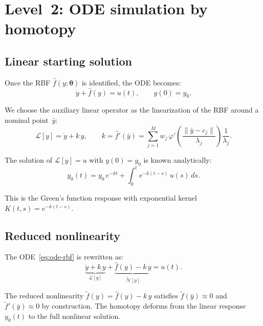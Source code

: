 \documentclass[11pt,a4paper]{article}
\begin{document}
\section{Level~2: ODE simulation by homotopy}
\label{sec:simulation}

\subsection{Linear starting solution}

Once the RBF $\hat{f}(y; \boldsymbol{\theta})$ is identified, the ODE becomes:
\begin{equation}
\dot{y} + \hat{f}(y) = u(t), \qquad y(0) = y_0.
\label{eq:ode-rbf}
\end{equation}

We choose the auxiliary linear operator as the linearization of the RBF around a nominal point~$\bar{y}$:
\begin{equation}
\mathcal{L}[y] = \dot{y} + k\,y, \qquad k = \hat{f}'(\bar{y}) = \sum_{j=1}^{M} w_j\,\varphi'\!\left(\frac{\|\bar{y} - c_j\|}{\lambda_j}\right)\frac{1}{\lambda_j}.
\label{eq:L-linear}
\end{equation}

The solution of $\mathcal{L}[y] = u$ with $y(0) = y_0$ is known analytically:
\begin{equation}
y_0(t) = y_0\,e^{-kt} + \int_0^t e^{-k(t-s)}\,u(s)\,ds.
\label{eq:y0-linear}
\end{equation}

This is the Green's function response with exponential kernel $K(t,s) = e^{-k(t-s)}$.

\subsection{Reduced nonlinearity}

The ODE~\eqref{eq:ode-rbf} is rewritten as:
\begin{equation}
\underbrace{\dot{y} + k\,y}_{\mathcal{L}[y]} + \underbrace{\hat{f}(y) - k\,y}_{\tilde{\mathcal{N}}[y]} = u(t).
\label{eq:split}
\end{equation}

The reduced nonlinearity $\tilde{f}(y) = \hat{f}(y) - k\,y$ satisfies $\tilde{f}(\bar{y}) \approx 0$ and $\tilde{f}'(\bar{y}) \approx 0$ by construction. The homotopy deforms from the linear response~$y_0(t)$ to the full nonlinear solution.
\end{document}

